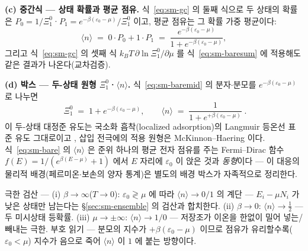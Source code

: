 \textbf{(c) 중간식 --- 상태 확률과 평균 점유.} 식~\eqref{eq:sm-gc} 의 둘째 식으로 두 상태의 확률은
$P_0=1/\Xi_1^{0}$·$P_1=e^{-\beta(\varepsilon_0-\mu)}/\Xi_1^{0}$ 이고, 평균 점유는 그 확률 가중 평균이다:
\begin{equation}
\langle n\rangle
\;=\;0\cdot P_0+1\cdot P_1
\;=\;\frac{e^{-\beta(\varepsilon_0-\mu)}}{1+e^{-\beta(\varepsilon_0-\mu)}},
\label{eq:sm-baremid}
\end{equation}
그리고 식~\eqref{eq:sm-gc} 의 셋째 식 $k_BT\,\partial\ln\Xi_1^{0}/\partial\mu$ 를
식~\eqref{eq:sm-baresum} 에 적용해도 같은 결과가 나온다(교차검증).

\textbf{(d) 박스 --- 두-상태 원형 $\Xi_1^{0}$·$\langle n\rangle$.} 식~\eqref{eq:sm-baremid} 의
분자$\cdot$분모를 $e^{-\beta(\varepsilon_0-\mu)}$ 로 나누면
\begin{equation}
\boxed{\;\Xi_1^{0}\;=\;1+e^{-\beta(\varepsilon_0-\mu)},\qquad
\langle n\rangle\;=\;\frac{1}{1+e^{+\beta(\varepsilon_0-\mu)}}\;.}
\label{eq:sm-bare}
\end{equation}
이 두-상태 대정준 유도는 국소화 흡착(localized adsorption)의 Langmuir 등온선 표준 유도
그대로이고 \cite{hill1960,fowler1939}, 삽입 전극에의 적용 원형은 McKinnon--Haering
\cite{mckinnon1983} 이다. 식~\eqref{eq:sm-bare} 의 $\langle n\rangle$ 은 준위 하나의 평균 전자 점유를
주는 Fermi--Dirac 함수 $f(E)=1/(e^{\beta(E-\mu)}+1)$ 에서 $E$ 자리에 $\varepsilon_0$ 이 앉은 것과
\emph{동형}이다 --- 이 대응의 물리적 배경(페르미온$\cdot$보손의 양자 통계)은 별도의 배경 박스가
자족적으로 정리한다.
\begin{verifybox}
극한 검산 --- (i) $\beta\to\infty$($T\to0$): $\varepsilon_0\gtrless\mu$ 에 따라 $\langle n\rangle\to0/1$
의 계단 --- $E_i-\mu N_i$ 가 낮은 상태만 남는다는 \S\ref{sec:sm-ensemble} 의 검산과 합치한다.
(ii) $\beta\to0$: $\langle n\rangle\to\tfrac12$ --- 두 미시상태 등확률. (iii) $\mu\to\pm\infty$:
$\langle n\rangle\to1/0$ --- 저장조가 이온을 한없이 밀어 넣는/빼내는 극한. 부호 읽기 --- 분모의 지수가
$+\beta(\varepsilon_0-\mu)$ 이므로 점유가 유리할수록($\varepsilon_0<\mu$) 지수가 음으로 죽어
$\langle n\rangle$ 이 $1$ 에 붙는 방향이다.
\end{verifybox}

